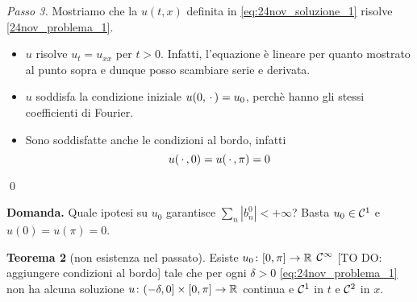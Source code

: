 \textit{Passo 3.} Mostriamo che la $u(t,x)$ definita in \eqref{eq:24nov_soluzione_1} risolve \eqref{24nov_problema_1}.
\begin{itemize}

	\item $u$ risolve $u_t = u_{xx}$ per $t > 0$.
	Infatti, l'equazione è lineare per quanto mostrato al punto sopra e dunque posso scambiare serie e derivata.


	\item $u$ soddisfa la condizione iniziale $u(0,\,\cdot\,) = u_0$, perchè hanno gli stessi coefficienti di Fourier.


	\item Sono soddisfatte anche le condizioni al bordo, infatti
	$$
	u(\,\cdot\,,0) = u(\,\cdot\,,\pi) = 0
	$$
\end{itemize}
\qed

\textbf{Domanda.} Quale ipotesi su $u_0$ garantisce $\sum_n |b_n^0| < +\infty$? Basta $u_0 \in \mathcal{C}^1$ e $u(0) = u(\pi) = 0$.

\textbf{Teorema 2} (non esistenza nel passato).
Esiste $u_0 \colon [0,\pi] \to \mathbb R$ $\mathcal{C}^\infty$ [TO DO: aggiungere condizioni al bordo] tale che per ogni $\delta > 0$ \eqref{eq:24nov_problema_1} non ha alcuna soluzione $u \colon (-\delta,0] \times [0,\pi] \to \mathbb R$ continua e $\mathcal{C}^1$ in $t$ e $\mathcal{C}^2 $ in $x$.
